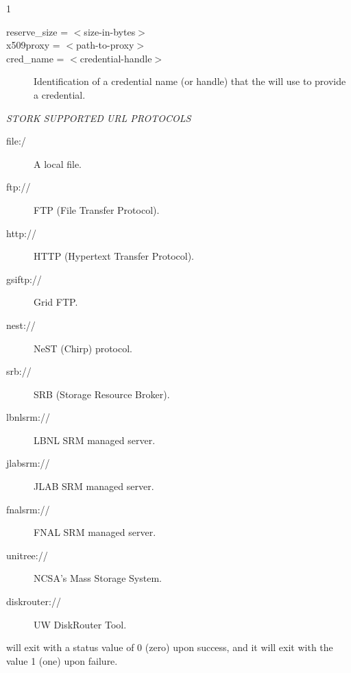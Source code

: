 \begin{ManPage}{\label{man-stork-submit}}{1}
\begin{description}
\item[reserve\_size = $<$size-in-bytes$>$]

\item[x509proxy = $<$path-to-proxy$>$]

\item[cred\_name = $<$credential-handle$>$]
Identification of a credential name (or handle) that the 
 will use to provide a credential.

\end{description}

\emph{STORK SUPPORTED URL PROTOCOLS}

\begin{description}
\item[file:/]
  A local file.
\item[ftp://]
  FTP (File Transfer Protocol).
\item[http://]
  HTTP (Hypertext Transfer Protocol).
\item[gsiftp://]
  Grid FTP.
\item[nest://]
  NeST (Chirp) protocol.
\item[srb://]
  SRB (Storage Resource Broker).
\item[lbnlsrm://]
  LBNL SRM managed server.
\item[jlabsrm://]
  JLAB SRM managed server.
\item[fnalsrm://]
  FNAL SRM managed server.
\item[unitree://]
  NCSA's Mass Storage System.
\item[diskrouter://]
  UW DiskRouter Tool.
\end{description}

\begin{Options}
	\ToolArgsBaseDesc
\end{Options}

\ExitStatus

 will exit with a status value of 0 (zero) upon success,
and it will exit with the value 1 (one) upon failure.

\end{ManPage}
